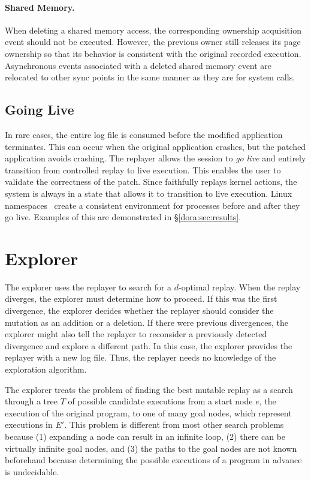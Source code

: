 \paragraph{Shared Memory.}
When deleting a shared memory access, the corresponding ownership
acquisition event should not be executed.  However, the previous owner
still releases its page ownership so that its behavior is consistent
with the original recorded execution. Asynchronous events associated with a
deleted shared memory event are relocated to other sync points in the same
manner as they are for system calls.

\subsection{Going Live}
In rare cases, the entire log file is
consumed before the modified application terminates. This can occur when the
original application crashes, but the patched application avoids crashing. The
replayer allows the session to \emph{go live} and entirely transition from
controlled replay to live execution. This enables the user to
validate the correctness of the patch.
Since {\dora} faithfully replays kernel actions, the system is always in a state that allows
it to transition to live execution. Linux namespaces~\cite{namespaces:linux06}
create a consistent environment for processes before and after they go live.
Examples of this are demonstrated in \S\ref{dora:sec:results}.
\section{Explorer}
\label{dora:sec:explorer}

The explorer uses the replayer to search for a $d$-optimal replay. When the
replay diverges, the explorer must determine how to proceed.
If this was the first divergence, the
explorer decides whether the replayer should consider the mutation as
an addition or a deletion. If there were previous divergences, the
explorer might also tell the replayer to reconsider a previously
detected divergence and explore a different path. In this case, the
explorer provides the replayer with a new log file.  Thus, the 
replayer needs no knowledge of the exploration algorithm.

The explorer treats the problem of finding the best mutable replay as
a search through a tree $T$ of possible candidate executions from a
start node $e$, the execution of the original program, to one of
many goal nodes, which represent executions in $E'$.
This problem is different from most other search problems because
(1) expanding a node can result in an infinite loop,
(2) there can be virtually infinite goal nodes, and
(3) the paths to the
goal nodes are not known beforehand because determining the possible
executions of a program in advance is undecidable.

